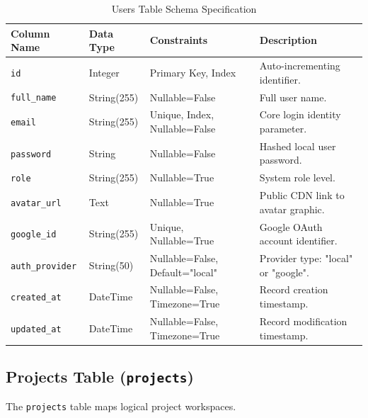 \begin{table}[h!]
\centering
\small
\renewcommand{\arraystretch}{1.4}
\begin{tabularx}{\textwidth}{l l l X}
    \toprule[1.5pt]
    \rowcolor{primary!5}
    \textbf{\color{primary}Column Name} & \textbf{\color{primary}Data Type} & \textbf{\color{primary}Constraints} & \textbf{\color{primary}Description} \\
    \midrule
    \texttt{id} & Integer & Primary Key, Index & Auto-incrementing identifier. \\
    \texttt{full\_name} & String(255) & Nullable=False & Full user name. \\
    \texttt{email} & String(255) & Unique, Index, Nullable=False & Core login identity parameter. \\
    \texttt{password} & String & Nullable=False & Hashed local user password. \\
    \texttt{role} & String(255) & Nullable=True & System role level. \\
    \texttt{avatar\_url} & Text & Nullable=True & Public CDN link to avatar graphic. \\
    \texttt{google\_id} & String(255) & Unique, Nullable=True & Google OAuth account identifier. \\
    \texttt{auth\_provider} & String(50) & Nullable=False, Default="local" & Provider type: "local" or "google". \\
    \texttt{created\_at} & DateTime & Nullable=False, Timezone=True & Record creation timestamp. \\
    \texttt{updated\_at} & DateTime & Nullable=False, Timezone=True & Record modification timestamp. \\
    \bottomrule[1.5pt]
\end{tabularx}
\caption{Users Table Schema Specification}
\label{tab:users_table}
\end{table}

\subsection{Projects Table (\texttt{projects})}
The \texttt{projects} table maps logical project workspaces.

